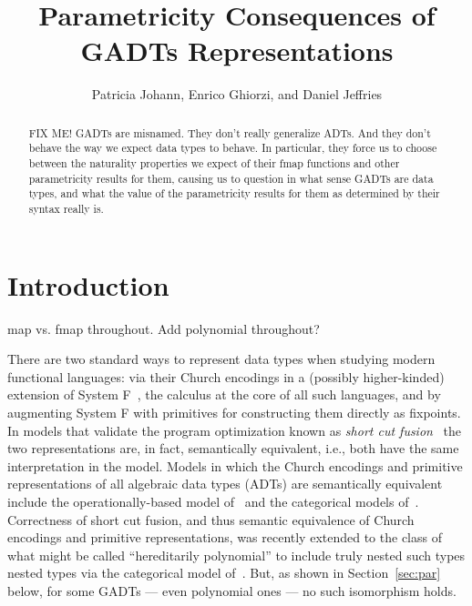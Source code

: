 \documentclass[acmsmall,screen,review,anonymous]{acmart}
\title[Parametricity Consequences of GADTs
  Representations]{Parametricity Consequences of GADTs
  Representations}
\author{Patricia Johann, Enrico Ghiorzi, and Daniel Jeffries}
\affiliation{ \institution{Appalachian State University}}
\theoremstyle{definition}
\begin{document}
\begin{abstract}
{\color{red} FIX ME!} GADTs are misnamed. They don't really generalize
ADTs. And they don't behave the way we expect data types to behave. In
particular, they force us to choose between the naturality properties
we expect of their fmap functions and other parametricity results for
them, causing us to question in what sense GADTs are data types, and
what the value of the parametricity results for them as determined by
their syntax really is.
\end{abstract}

\maketitle

\section{Introduction}\label{sec:intro}
{\color{blue} map vs. fmap throughout.} {\color{blue} Add polynomial
  throughout?}

There are two standard ways to represent data types when studying
modern functional languages: via their Church encodings in a (possibly
higher-kinded) extension of System F~\cite{gir72}, the calculus at the
core of all such languages, and by augmenting System F
with primitives for constructing them directly as fixpoints.
In models that validate the program optimization known as {\em short
  cut fusion}~\cite{glp93} the two representations are, in fact,
semantically equivalent, i.e., both have the same interpretation in
the model. Models in which the Church encodings and primitive
representations of all algebraic data types (ADTs) are semantically
equivalent include the operationally-based model of~\cite{pit98,pit00}
and the categorical models of~\cite{joh02,joh03}.
Correctness of short cut fusion, and thus semantic equivalence of
Church encodings and primitive representations, was recently extended
to the class of what might be called ``hereditarily polynomial''
{\color{blue} to include truly nested such types} nested types via the
categorical model of~\cite{jgj21}. But, as shown in
Section~\ref{sec:par} below, for some GADTs --- even polynomial ones
--- no such isomorphism holds.
\end{document}
